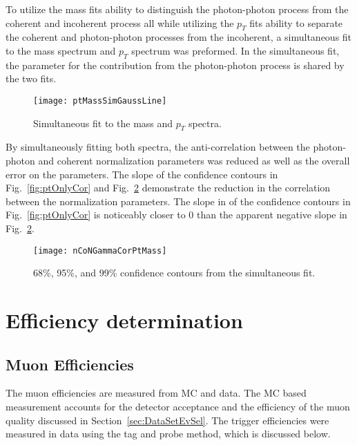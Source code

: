     To utilize the mass fits ability to distinguish the photon-photon process 
      from the coherent and incoherent process all while utilizing the $p_{T}$
      fits ability to separate the coherent and photon-photon processes from 
      the incoherent, a simultaneous fit to the mass spectrum and $p_{T}$ 
      spectrum was preformed.
    In the simultaneous fit, the parameter for the contribution from the 
      photon-photon process is shared by the two fits.
    
    \begin{figure}[!Hhbt]
      \centering
      \texttt{[image: ptMassSimGaussLine]}
      \caption{Simultaneous fit to the mass and $p_{T}$ spectra.}
      \label{fig:simFitMassPtGauss}
    \end{figure}

    By simultaneously fitting both spectra, the anti-correlation between the 
      photon-photon and coherent normalization parameters was reduced as well
      as the overall error on the parameters.
    The slope of the confidence contours in Fig.~\ref{fig:ptOnlyCor} and 
      Fig.~\ref{fig:simGaussCor} demonstrate the reduction in the correlation
      between the normalization parameters. 
    The slope in of the confidence contours in Fig.~\ref{fig:ptOnlyCor} 
      is noticeably closer to 0 than the apparent negative slope in 
      Fig.~\ref{fig:simGaussCor}.
    \begin{figure}[!Hhbt]
      \centering
      \texttt{[image: nCoNGammaCorPtMass]}
      \caption{68\%, 95\%, and 99\% confidence contours from the 
        simultaneous fit. }
      \label{fig:simGaussCor}
    \end{figure}

  \section{\label{sec:effDet} Efficiency determination}
    \subsection{Muon Efficiencies}
      The muon efficiencies are measured from MC and data.
      The MC based measurement accounts for the detector acceptance and the 
        efficiency of the muon quality discussed in 
        Section~\ref{sec:DataSetEvSel}.
      The trigger efficiencies were measured in data using the tag and probe 
        method, which is discussed below. 

